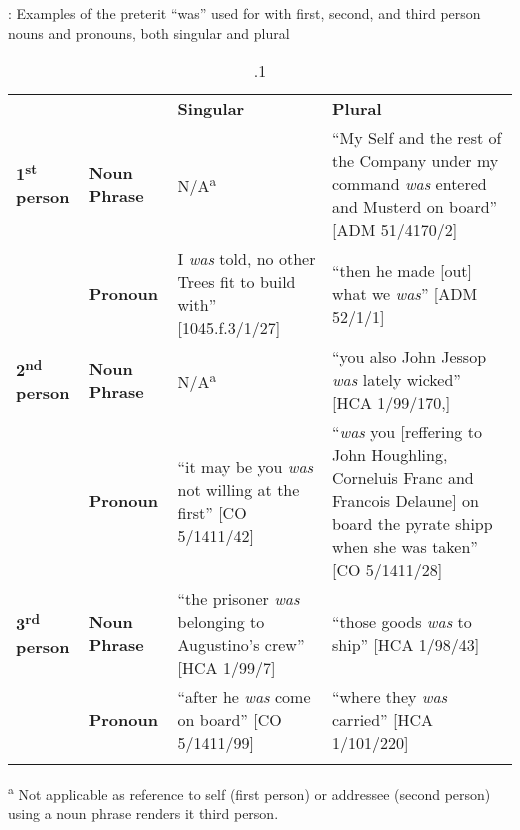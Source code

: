 \begin{table}
\caption{\label{tab:key:6}.1}: Examples of the preterit “was” used for with first, second, and third person nouns and pronouns, both singular and plural

\begin{tabularx}{\textwidth}{XXXX} &  & \textbf{Singular} & \textbf{Plural}\\
\lsptoprule
 \textbf{1\textsuperscript{st}} \textbf{person} & \textbf{Noun} \textbf{Phrase} & N/A\textsuperscript{a} & “My Self and the rest of the Company under my command \textit{was} entered and Musterd on board” [ADM 51/4170/2]\\
& \textbf{Pronoun} & I \textit{was} told, no other Trees fit to build with” [1045.f.3/1/27] & “then he made [out] what we \textit{was}” [ADM 52/1/1]\\
 \textbf{2\textsuperscript{nd}} \textbf{person} & \textbf{Noun} \textbf{Phrase} & N/A\textsuperscript{a} & “you also John Jessop \textit{was} lately wicked” [HCA 1/99/170,]\\
& \textbf{Pronoun} & “it may be you \textit{was} not willing at the first” [CO 5/1411/42] & “\textit{was} you [reffering to John Houghling, Corneluis Franc and Francois Delaune] on board the pyrate shipp when she was taken” [CO 5/1411/28] \\
 \textbf{3\textsuperscript{rd}} \textbf{person} & \textbf{Noun} \textbf{Phrase} & “the prisoner \textit{was} belonging to Augustino’s crew” [HCA 1/99/7] & “those goods \textit{was} to ship” [HCA 1/98/43] \\
& \textbf{Pronoun} & “after he \textit{was} come on board” [CO 5/1411/99] & “where they \textit{was} carried” [HCA 1/101/220]\\

\lspbottomrule
\end{tabularx}\end{table}
\textsuperscript{a} Not applicable as reference to self (first person) or addressee (second person) using a noun phrase renders it third person. 

